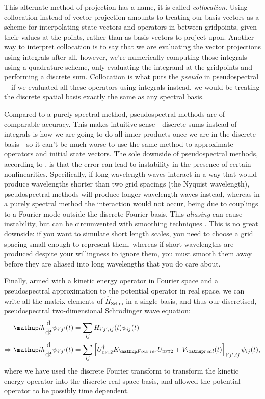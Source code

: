 This alternate method of projection has a name, it is called \emph{collocation}\cite[p227]{tannor_introduction_2007}. Using collocation instead of vector projection amounts to treating our basis vectors as a scheme for interpolating state vectors and operators in between gridpoints, given their values at the points, rather than as basis vectors to project upon. Another way to interpret collocation is to say that we are evaluating the vector projections using integrals after all, however, we're numerically computing those integrals using a quadrature scheme, only evaluating the integrand at the gridpoints and performing a discrete sum\cite[p283]{tannor_introduction_2007}. Collocation is what puts the \emph{pseudo} in pseudospectral---if we evaluated all these operators using integrals instead, we would be treating the discrete spatial basis exactly the same as any spectral basis. 

Compared to a purely spectral method, pseudospectral methods are of comparable accuracy\cite{orszag_comparison_1972}. This makes intuitive sense---discrete sums instead of integrals is how we are going to do all inner products once we are in the discrete basis---so it can't be much worse to use the same method to approximate operators and initial state vectors. The sole downside of pseudospectral methods, according to \cite{orszag_comparison_1972}, is that the error can lead to instability in the presence of certain nonlinearities. Specifically, if long wavelength waves interact in a way that would produce wavelengths shorter than two grid spacings (the Nyquist wavelength), pseudospectral methods will produce longer wavelength waves instead, whereas in a purely spectral method the interaction would not occur, being due to couplings to a Fourier mode outside the discrete Fourier basis. This \emph{aliasing} can cause instability, but can be circumvented with smoothing techniques \cite{phillips_example_1959}. This is no great downside: if you want to simulate short length scales, you need to choose a grid spacing small enough to represent them, whereas if short wavelengths are produced despite your willingness to ignore them, you must smooth them away before they are aliased into long wavelengths that you do care about.

Finally, armed with a kinetic energy operator in Fourier space and a pseudospectral approximation to the potential operator in real space, we can write all the matrix elements of $\hat H_\textrm{Schr\"o}$ in a single basis, and thus our discretised, pseudospectral two-dimensional Schr\"odinger wave equation:
\begin{align}
\ii\hbar\dv{t}\psi_{i^\prime j^\prime}(t) &= \sum_{ij} H_{i^\prime j^\prime, ij}(t) \psi_{ij}(t)\\
\Rightarrow \ii\hbar\dv{t}\psi_{i^\prime j^\prime}(t) &=\sum_{ij}
\left[
U^\dagger_{\textsc{dft2}}K_\up{Fourier}U_{\textsc{dft2}}
 + V_\up{real}(t)
\right]_{i^\prime j^\prime, ij}\psi_{ij}(t),
\end{align}
where we have used the discrete Fourier transform to transform the kinetic energy operator into the discrete real space basis, and allowed the potential operator to be possibly time dependent.

